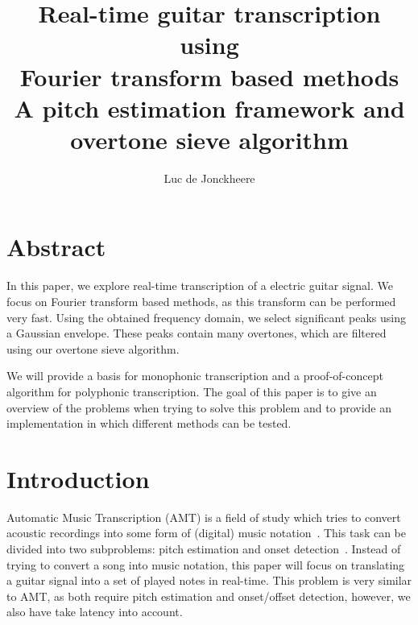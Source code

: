 \documentclass[10pt,twocolumn]{article}
\title{\textbf{Real-time guitar transcription using\\Fourier transform based methods}\\A pitch estimation framework and overtone sieve algorithm}
\author{Luc de Jonckheere}
\begin{document}

\maketitle


\section*{Abstract}
In this paper, we explore real-time transcription of a electric guitar signal. We focus on Fourier transform based methods, as this transform can be performed very fast. Using the obtained frequency domain, we select significant peaks using a Gaussian envelope. These peaks contain many overtones, which are filtered using our overtone sieve algorithm.

We will provide a basis for monophonic transcription and a proof-of-concept algorithm for polyphonic transcription. The goal of this paper is to give an overview of the problems when trying to solve this problem and to provide an implementation in which different methods can be tested.



\section{Introduction}
Automatic Music Transcription (AMT) is a field of study which tries to convert acoustic recordings into some form of (digital) music notation~\cite{survey1}. This task can be divided into two subproblems: pitch estimation and onset detection~\cite{survey2}. Instead of trying to convert a song into music notation, this paper will focus on translating a guitar signal into a set of played notes in real-time. This problem is very similar to AMT, as both require pitch estimation and onset/offset detection, however, we also have take latency into account.
\end{document}
